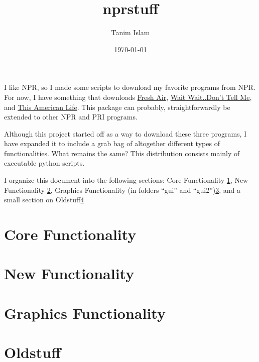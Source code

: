 \documentclass[]{article}
\title{nprstuff}
\date{\today}
\author{Tanim Islam}
\begin{document}
\maketitle

I like NPR, so I made some scripts to download my favorite programs from
NPR. For now, I have something that downloads
\href{http://www.npr.org/programs/fresh-air/}{Fresh Air},
\href{http://www.npr.org/programs/wait-wait-dont-tell-me/}{Wait
Wait..Don't Tell Me}, and \href{http://www.thisamericanlife.org/}{This
American Life}. This package can probably, straightforwardly be
extended to other NPR and PRI programs.

Although this project started off as a way to download these three
programs, I have expanded it to include a grab bag of altogether
different types of functionalities. What remains the same? This
distribution consists mainly of executable python scripts.

I organize this document into the following sections: Core
Functionality \ref{sec:core_functionality}, New Functionality
\ref{sec:new_functionality}, Graphics Functionality (in folders
``gui'' and ``gui2'')\ref{sec:graphics_functionality}, and a small
section on Oldstuff\ref{sec:oldstuff}

\section{Core Functionality} \label{sec:core_functionality}

\section{New Functionality} \label{sec:new_functionality}

\section{Graphics Functionality} \label{sec:graphics_functionality}

\section{Oldstuff} \label{sec:oldstuff}
\end{document}
